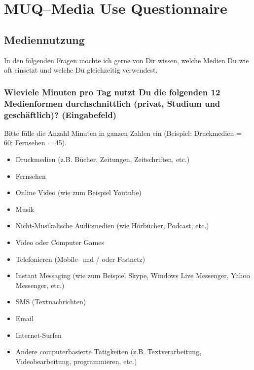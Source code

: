 \section{MUQ--Media Use Questionnaire}\label{anhangSection.muq}   
\subsection*{Mediennutzung}    
In den folgenden Fragen möchte ich gerne von Dir wissen, welche Medien Du wie oft einsetzt und welche Du gleichzeitig verwendest.
\subsubsection*{Wieviele Minuten pro Tag nutzt Du die folgenden 12 Medienformen durchschnittlich (privat, Studium und geschäftlich)? (Eingabefeld)}
Bitte fülle die Anzahl Minuten in ganzen Zahlen ein (Beispiel: Druckmedien = 60; Fernsehen = 45).
    \begin{itemize}
      \item Druckmedien (z.B. Bücher, Zeitungen, Zeitschriften, etc.)
      \item Fernsehen
      \item Online Video (wie zum Beispiel Youtube)
      \item Musik
      \item Nicht-Musikalische Audiomedien (wie Hörbücher, Podcast, etc.)
      \item Video oder Computer Games
      \item Telefonieren (Mobile- und / oder Festnetz)
      \item Instant Messaging (wie zum Beispiel Skype, Windows Live Messenger, Yahoo Messenger, etc.)
      \item SMS (Textnachrichten)
      \item Email
      \item Internet-Surfen
      \item Andere computerbasierte Tätigkeiten (z.B. Textverarbeitung, Videobearbeitung, programmieren, etc.)
    \end{itemize} 
